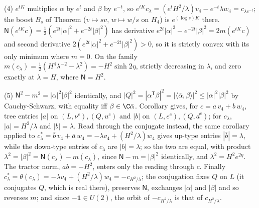 (4) $e^{tK}$ multiplies $\alpha$ by $e^{t}$ and $\beta$ by $e^{-t}$, so $e^{tK}c_{\lambda} = (e^{t}H^{2}/\lambda)v_{4} - e^{-t}\lambda w_{4} = c_{\lambda e^{-t}}$; the boost $B_{s}$ of Theorem  ($v \mapsto sv$, $w \mapsto w/s$ on $H_{4}$) is $e^{(\log s)K}$ there. $\mathsf{N}(e^{tK}c) = \tfrac12(e^{2t}|\alpha|^{2} + e^{-2t}|\beta|^{2})$ has derivative $e^{2t}|\alpha|^{2} - e^{-2t}|\beta|^{2} = 2m(e^{tK}c)$ and second derivative $2(e^{2t}|\alpha|^{2} + e^{-2t}|\beta|^{2}) > 0$, so it is strictly convex with its only minimum where $m = 0$. On the family $m(c_{\lambda}) = \tfrac12(H^{4}\lambda^{-2} - \lambda^{2}) = -H^{2}\sinh 2\eta$, strictly decreasing in $\lambda$, and zero exactly at $\lambda = H$, where $\mathsf{N} = H^{2}$.

(5) $\mathsf{N}^{2} - m^{2} = |\alpha|^{2}|\beta|^{2}$ identically, and $|Q|^{2} = |\alpha^{\mathsf T}\beta|^{2} = |\langle\bar{\alpha}, \beta\rangle|^{2} \le |\alpha|^{2}|\beta|^{2}$ by Cauchy-Schwarz, with equality iff $\beta \in \C\bar{\alpha}$. Corollary  gives, for $c = a\,v_{4} + b\,w_{4}$, tree entries $|a|$ on $(L, \nu^{c}), (Q, u^{c})$ and $|b|$ on $(L, e^{c}), (Q, d^{c})$; for $c_{\lambda}$, $|a| = H^{2}/\lambda$ and $|b| = \lambda$. Read through the conjugate instead, the same corollary applied to $c_{\lambda}^{*} = \bar{b}\,v_{4} + \bar{a}\,w_{4} = -\lambda v_{4} + (H^{2}/\lambda)w_{4}$ gives up-type entries $|\bar{b}| = \lambda$, while the down-type entries of $c_{\lambda}$ are $|b| = \lambda$; so the two are equal, with product $\lambda^{2} = |\beta|^{2} = \mathsf{N}(c_{\lambda}) - m(c_{\lambda})$, since $\mathsf{N} - m = |\beta|^{2}$ identically, and $\lambda^{2} = H^{2}e^{2\eta}$. The tractor norm, $ab = -H^{2}$, enters only the reading through $c$. Finally $c_{\lambda}^{*} = \theta(c_{\lambda}) = -\lambda v_{4} + (H^{2}/\lambda)w_{4} = -c_{H^{2}/\lambda}$; the conjugation fixes $Q$ on $L$ (it conjugates $Q$, which is real there), preserves $\mathsf{N}$, exchanges $|\alpha|$ and $|\beta|$ and so reverses $m$; and since $-\mathbf{1} \in U(2)$, the orbit of $-c_{H^{2}/\lambda}$ is that of $c_{H^{2}/\lambda}$.


